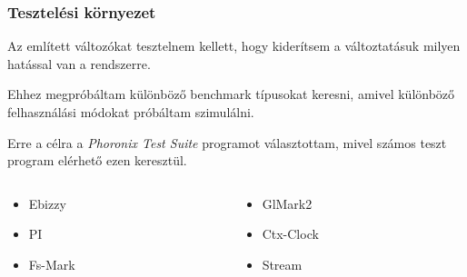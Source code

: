 \documentclass{beamer}
\begin{document}
\begin{frame}
\frametitle{Tesztelési környezet}
Az említett változókat tesztelnem kellett, hogy kiderítsem a változtatásuk milyen hatással van a rendszerre.

\bigskip

Ehhez megpróbáltam különböző benchmark típusokat keresni, amivel különböző felhasználási módokat próbáltam szimulálni.

\bigskip

Erre a célra a \textit{Phoronix Test Suite} programot választottam, mivel számos teszt program elérhető ezen keresztül.

\begin{center}
\begin{columns}
	\begin{column}{25mm}
\begin{itemize}
	\item Ebizzy
	\item PI
	\item Fs-Mark

\end{itemize}
	\end{column}
	\begin{column}{3cm}
\begin{itemize}
	\item GlMark2
	\item Ctx-Clock
	\item Stream
\end{itemize}
\end{column}
\end{columns}
\end{center}

\end{frame}
\end{document}
